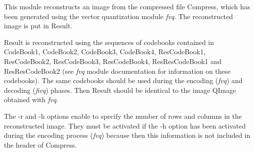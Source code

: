 This module reconstructs an image from the compressed file Compress, 
which has been generated using the vector quantization module {\em fvq}. 
The reconstructed image is put in Result. 

Result is reconstructed using the sequences of codebooks contained 
in CodeBook1, CodeBook2, CodeBook3, CodeBook4, ResCodeBook1, 
ResCodeBook2, ResCodeBook3, ResCodeBook4, ResResCodeBook1 and ResResCodeBook2 
(see {\em fvq} module documentation for information on these codebooks). 
The same codebooks should be used during the encoding ({\em fvq}) and 
decoding ({\em fivq}) phases. Then Result should be identical 
to the image QImage obtained with {\em fvq}. 


The -r and -h options enable to specify the number of rows and columns 
in the reconstructed image. They must be activated if the -h option has 
been activated during the encoding process ({\em fvq}) because then this 
information is not included in the header of Compress. 
